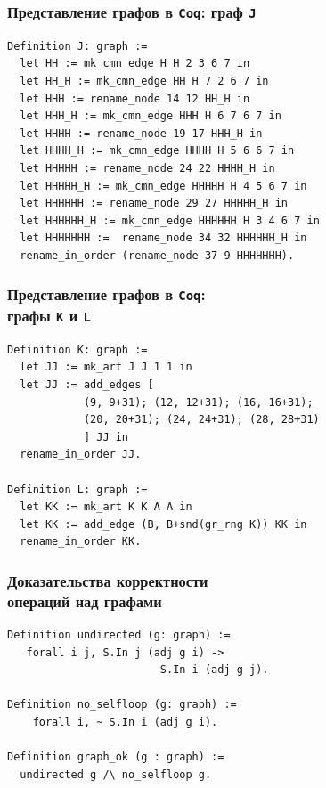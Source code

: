 \documentclass[14pt]{beamer}
\begin{document}
\begin{frame}[fragile]
\frametitle{Представление графов в {\tt Coq}: граф {\tt J}}

{\small 
\begin{verbatim}
Definition J: graph :=
  let HH := mk_cmn_edge H H 2 3 6 7 in
  let HH_H := mk_cmn_edge HH H 7 2 6 7 in
  let HHH := rename_node 14 12 HH_H in
  let HHH_H := mk_cmn_edge HHH H 6 7 6 7 in
  let HHHH := rename_node 19 17 HHH_H in
  let HHHH_H := mk_cmn_edge HHHH H 5 6 6 7 in
  let HHHHH := rename_node 24 22 HHHH_H in
  let HHHHH_H := mk_cmn_edge HHHHH H 4 5 6 7 in
  let HHHHHH := rename_node 29 27 HHHHH_H in
  let HHHHHH_H := mk_cmn_edge HHHHHH H 3 4 6 7 in
  let HHHHHHH :=  rename_node 34 32 HHHHHH_H in
  rename_in_order (rename_node 37 9 HHHHHHH).
\end{verbatim}
}
\end{frame}

\begin{frame}[fragile]
\frametitle{Представление графов в {\tt Coq}: \\ графы {\tt K} и {\tt L}}

{\small 
\begin{verbatim}
Definition K: graph :=
  let JJ := mk_art J J 1 1 in
  let JJ := add_edges [
            (9, 9+31); (12, 12+31); (16, 16+31); 
            (20, 20+31); (24, 24+31); (28, 28+31)
            ] JJ in
  rename_in_order JJ.

Definition L: graph :=
  let KK := mk_art K K A A in
  let KK := add_edge (B, B+snd(gr_rng K)) KK in
  rename_in_order KK.
\end{verbatim}
}
\end{frame}

\begin{frame}[fragile]
\frametitle{Доказательства корректности \\ операций над графами}

\begin{verbatim}
Definition undirected (g: graph) := 
   forall i j, S.In j (adj g i) -> 
                        S.In i (adj g j).

Definition no_selfloop (g: graph) := 
    forall i, ~ S.In i (adj g i).

Definition graph_ok (g : graph) := 
  undirected g /\ no_selfloop g.
\end{verbatim}
\end{frame}
\end{document}
